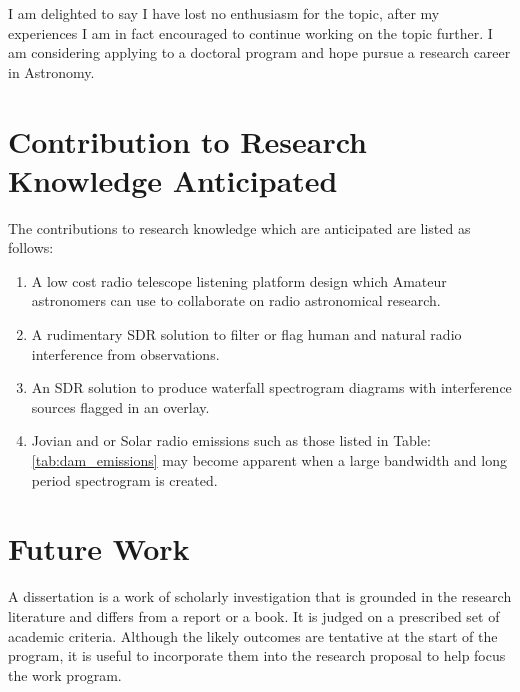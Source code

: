 \documentclass[runningheads,a4paper]{llncs}
\begin{document}
I am delighted to say I have lost no enthusiasm for the topic, after my experiences I am in fact encouraged to continue working on the topic further. I am considering applying to a doctoral program and hope pursue a research career in Astronomy.


%
%
\newpage
\section*{Contribution to Research Knowledge Anticipated}

The contributions to research knowledge which are anticipated are listed as follows:

\begin{enumerate}
  \item A low cost radio telescope listening platform design which Amateur astronomers can use to collaborate on radio astronomical research.
  \item A rudimentary \gls{SDR} solution to filter or flag human and natural radio interference from observations.
  \item An \gls{SDR} solution to produce waterfall spectrogram diagrams with interference sources flagged in an overlay.
  \item Jovian and or Solar radio emissions such as those listed in Table: \ref{tab:dam_emissions} may become apparent when a large bandwidth and long period spectrogram is created.
\end{enumerate} 



%
%
\newpage
\section*{Future Work}
A dissertation is a work of scholarly investigation that is grounded in the research literature and differs from a report or a book. It is judged on a prescribed set of academic criteria. Although the likely outcomes are tentative at the start of the program, it is useful to incorporate them into the research proposal to help focus the work program.
\end{document}

